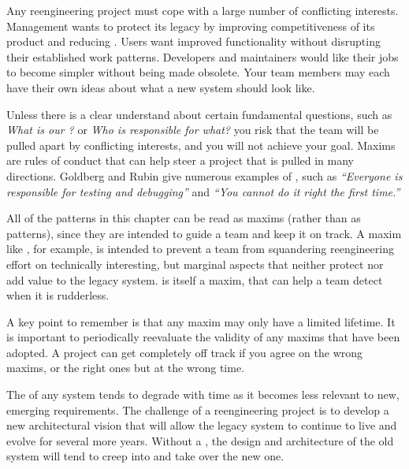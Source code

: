 \documentclass[a4paper,10pt,twoside]{book}
\begin{document}
\discussion
Any reengineering project must cope with a large number of conflicting interests. Management wants to protect its legacy by improving competitiveness of its product and reducing . Users want improved functionality without disrupting their established work patterns. Developers and maintainers would like their jobs to become simpler without being made obsolete. Your team members may each have their own ideas about what a new system should look like.

Unless there is a clear understand about certain fundamental questions, such as \emph{What is our ?} or \emph{Who is responsible for what?} you risk that the team will be pulled apart by conflicting interests, and you will not achieve your goal. Maxims are rules of conduct that can help steer a project that is pulled in many directions. Goldberg and Rubin \cite{Gold95a} give numerous examples of , such as \emph{``Everyone is responsible for testing and debugging''} and \emph{``You cannot do it right the first time.''}

All of the patterns in this chapter can be read as maxims (rather than as patterns), since they are intended to guide a team and keep it on track. A maxim like , for example, is intended to prevent a team from squandering reengineering effort on technically interesting, but marginal aspects that neither protect nor add value to the legacy system.  is itself a maxim, that can help a team detect when it is rudderless.

A key point to remember is that any maxim may only have a limited lifetime. It is important to periodically reevaluate the validity of any maxims that have been adopted. A project can get completely off track if you agree on the wrong maxims, or the right ones but at the wrong time.




\discussion
The  of any system tends to degrade with time as it becomes less relevant to new, emerging requirements. The challenge of a reengineering project is to develop a new architectural vision that will allow the legacy system to continue to live and evolve for several more years. Without a , the design and architecture of the old system will tend to creep into and take over the new one.
\end{document}
